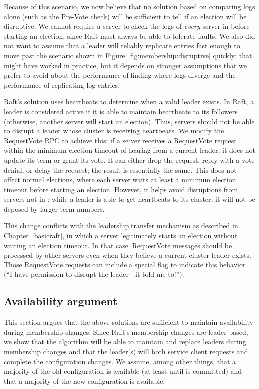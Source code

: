 Because of this scenario, we now believe that no solution based on
comparing logs alone (such as the Pre-Vote check)
will be sufficient to tell if an election will be
disruptive. We cannot require a server to check the logs of
\emph{every} server in \cnew{} before starting an election,
since Raft must always be able to tolerate
faults. We also did not want to assume that a leader will reliably
replicate entries fast enough to move past the scenario shown in
Figure~\ref{fig:membership:disruptive} quickly; that might have worked
in practice, but it depends on stronger assumptions that we prefer to
avoid about the performance of finding where logs diverge and the
performance of replicating log entries.

Raft's solution uses heartbeats to determine when a valid leader exists.
In Raft, a leader is considered
active if it is able to maintain heartbeats to its followers (otherwise,
another server will start an election). Thus, servers should not be able
to disrupt a leader whose cluster is receiving heartbeats.
We modify the RequestVote RPC to achieve this: if a server receives a
RequestVote request within the minimum election timeout of hearing from a
current leader, it does not update its term or grant its vote. It can
either drop the request, reply with a vote denial, or delay the request;
the result is essentially the same. This does not affect normal
elections, where each server waits at least a minimum election timeout
before starting an election. However, it helps avoid disruptions from
servers not in \cnew{}: while a leader is able to get heartbeats to its
cluster, it will not be deposed by larger term numbers.

This change conflicts with the leadership transfer mechanism as
described in Chapter~\ref{basicraft}, in which a server legitimately
starts an election without waiting an election timeout.
In that case, RequestVote messages
should be processed by other servers even when they believe a current
cluster leader exists. Those RequestVote requests can include a special
flag to indicate this behavior (``I have permission to disrupt
the leader---it told me to!'').


\subsection{Availability argument}
\label{membership:availability:argument}

This section argues that the above solutions are sufficient to maintain
availability during membership changes. Since Raft's membership changes
are leader-based, we show that the algorithm will be able to maintain
and replace leaders during membership changes and that the leader(s) will
both service client requests and complete the configuration changes.
We assume, among other things, that a majority of the old configuration
is available (at least until \cnew{} is committed) and that a majority of
the new configuration is available.

